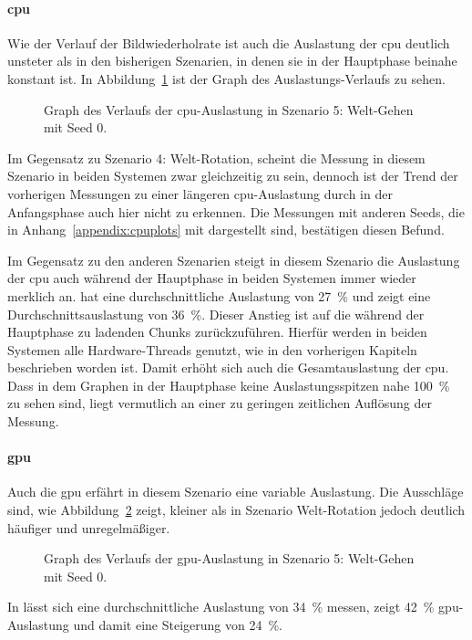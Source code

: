 \paragraph{\ac{cpu}}
Wie der Verlauf der Bildwiederholrate ist auch die Auslastung der \ac{cpu} deutlich unsteter als in den bisherigen Szenarien, in denen sie in der Hauptphase beinahe konstant ist. In Abbildung~\ref{fig:seed-0-walk-cpu} ist der Graph des Auslastungs-Verlaufs zu sehen.
\begin{figure}[!htbp]
	\caption[Graph des Verlaufs der -Auslastung in Szenario 5: Welt-Gehen mit Seed 0.]{Graph des Verlaufs der \ac{cpu}-Auslastung in Szenario 5: Welt-Gehen mit Seed 0.}\label{fig:seed-0-walk-cpu}
\end{figure}
Im Gegensatz zu Szenario 4: Welt-Rotation, scheint die Messung in diesem Szenario in beiden Systemen zwar gleichzeitig zu sein, dennoch ist der Trend der vorherigen Messungen zu einer längeren \ac{cpu}-Auslastung durch \sysB{} in der Anfangsphase auch hier nicht zu erkennen. Die Messungen mit anderen Seeds, die in Anhang~\vref{appendix:cpuplots} mit dargestellt sind, bestätigen diesen Befund.

Im Gegensatz zu den anderen Szenarien steigt in diesem Szenario die Auslastung der \ac{cpu} auch während der Hauptphase in beiden Systemen immer wieder merklich an. \sysA{} hat eine durchschnittliche Auslastung von \SI{27}{\percent} und \sysB{} zeigt eine Durchschnittsauslastung von \SI{36}{\percent}. Dieser Anstieg ist auf die während der Hauptphase zu ladenden Chunks zurückzuführen. Hierfür werden in beiden Systemen alle Hardware-Threads genutzt, wie in den vorherigen Kapiteln beschrieben worden ist. Damit erhöht sich auch die Gesamtauslastung der \ac{cpu}. Dass in dem Graphen in der Hauptphase keine Auslastungsspitzen nahe \SI{100}{\percent} zu sehen sind, liegt vermutlich an einer zu geringen zeitlichen Auflösung der Messung.

\paragraph{\ac{gpu}}
Auch die \ac{gpu} erfährt in diesem Szenario eine variable Auslastung. Die Ausschläge sind, wie Abbildung~\ref{fig:seed-0-walk-gpu} zeigt, kleiner als in Szenario Welt-Rotation jedoch deutlich häufiger und unregelmäßiger.
\begin{figure}[!htbp]
	\caption[Graph des Verlaufs der -Auslastung in Szenario 5: Welt-Gehen mit Seed 0.]{Graph des Verlaufs der \ac{gpu}-Auslastung in Szenario 5: Welt-Gehen mit Seed 0.}\label{fig:seed-0-walk-gpu}
\end{figure}
In \sysA{} lässt sich eine durchschnittliche Auslastung von \SI{34}{\percent} messen, \sysB{} zeigt \SI{42}{\percent} \ac{gpu}-Auslastung und damit eine Steigerung von \SI{24}{\percent}.

